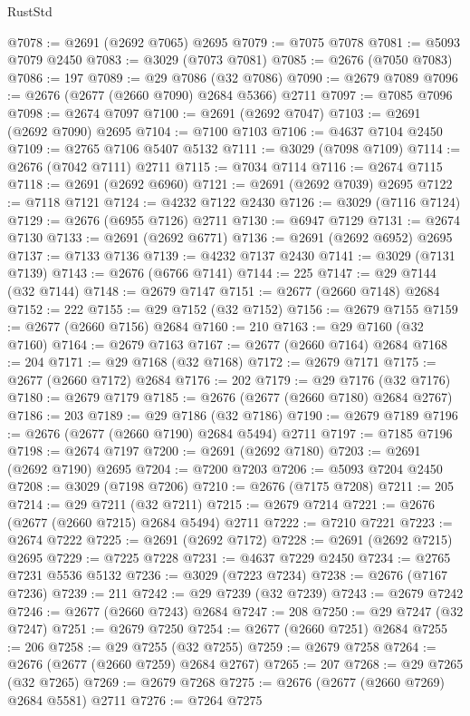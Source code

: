 \begin{lexlean}{RustStd}
\begin{coremodule}
@7078 := @2691 (@2692 @7065) @2695
@7079 := @7075 @7078
@7081 := @5093 @7079 @2450
@7083 := @3029 (@7073 @7081)
@7085 := @2676 (@7050 @7083)
@7086 := 197
@7089 := @29 @7086 (@32 @7086)
@7090 := @2679 @7089
@7096 := @2676 (@2677 (@2660 @7090) @2684 @5366) @2711
@7097 := @7085 @7096
@7098 := @2674 @7097
@7100 := @2691 (@2692 @7047)
@7103 := @2691 (@2692 @7090) @2695
@7104 := @7100 @7103
@7106 := @4637 @7104 @2450
@7109 := @2765 @7106 @5407 @5132
@7111 := @3029 (@7098 @7109)
@7114 := @2676 (@7042 @7111) @2711
@7115 := @7034 @7114
@7116 := @2674 @7115
@7118 := @2691 (@2692 @6960)
@7121 := @2691 (@2692 @7039) @2695
@7122 := @7118 @7121
@7124 := @4232 @7122 @2430
@7126 := @3029 (@7116 @7124)
@7129 := @2676 (@6955 @7126) @2711
@7130 := @6947 @7129
@7131 := @2674 @7130
@7133 := @2691 (@2692 @6771)
@7136 := @2691 (@2692 @6952) @2695
@7137 := @7133 @7136
@7139 := @4232 @7137 @2430
@7141 := @3029 (@7131 @7139)
@7143 := @2676 (@6766 @7141)
@7144 := 225
@7147 := @29 @7144 (@32 @7144)
@7148 := @2679 @7147
@7151 := @2677 (@2660 @7148) @2684
@7152 := 222
@7155 := @29 @7152 (@32 @7152)
@7156 := @2679 @7155
@7159 := @2677 (@2660 @7156) @2684
@7160 := 210
@7163 := @29 @7160 (@32 @7160)
@7164 := @2679 @7163
@7167 := @2677 (@2660 @7164) @2684
@7168 := 204
@7171 := @29 @7168 (@32 @7168)
@7172 := @2679 @7171
@7175 := @2677 (@2660 @7172) @2684
@7176 := 202
@7179 := @29 @7176 (@32 @7176)
@7180 := @2679 @7179
@7185 := @2676 (@2677 (@2660 @7180) @2684 @2767)
@7186 := 203
@7189 := @29 @7186 (@32 @7186)
@7190 := @2679 @7189
@7196 := @2676 (@2677 (@2660 @7190) @2684 @5494) @2711
@7197 := @7185 @7196
@7198 := @2674 @7197
@7200 := @2691 (@2692 @7180)
@7203 := @2691 (@2692 @7190) @2695
@7204 := @7200 @7203
@7206 := @5093 @7204 @2450
@7208 := @3029 (@7198 @7206)
@7210 := @2676 (@7175 @7208)
@7211 := 205
@7214 := @29 @7211 (@32 @7211)
@7215 := @2679 @7214
@7221 := @2676 (@2677 (@2660 @7215) @2684 @5494) @2711
@7222 := @7210 @7221
@7223 := @2674 @7222
@7225 := @2691 (@2692 @7172)
@7228 := @2691 (@2692 @7215) @2695
@7229 := @7225 @7228
@7231 := @4637 @7229 @2450
@7234 := @2765 @7231 @5536 @5132
@7236 := @3029 (@7223 @7234)
@7238 := @2676 (@7167 @7236)
@7239 := 211
@7242 := @29 @7239 (@32 @7239)
@7243 := @2679 @7242
@7246 := @2677 (@2660 @7243) @2684
@7247 := 208
@7250 := @29 @7247 (@32 @7247)
@7251 := @2679 @7250
@7254 := @2677 (@2660 @7251) @2684
@7255 := 206
@7258 := @29 @7255 (@32 @7255)
@7259 := @2679 @7258
@7264 := @2676 (@2677 (@2660 @7259) @2684 @2767)
@7265 := 207
@7268 := @29 @7265 (@32 @7265)
@7269 := @2679 @7268
@7275 := @2676 (@2677 (@2660 @7269) @2684 @5581) @2711
@7276 := @7264 @7275

\end{coremodule}
\end{lexlean}
